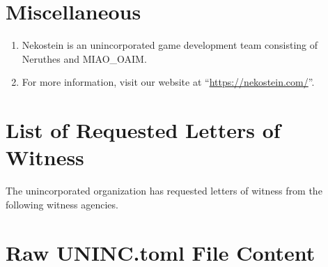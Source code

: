 \documentclass[11pt,a4paper,hidelinks]{article}
\begin{document}
\section{Miscellaneous}
\begin{enumerate}
    \item Nekostein is an unincorporated game development team consisting of Neruthes and MIAO\_OAIM.
    \item For more information, visit our website at ``\href{https://nekostein.com/}{https://nekostein.com/}''.
\end{enumerate}

\section{List of Requested Letters of Witness}
The unincorporated organization has requested letters of witness from the following witness agencies.

\begin{itemize}
    
\end{itemize}

\section{Raw UNINC.toml File Content}

\end{document}
